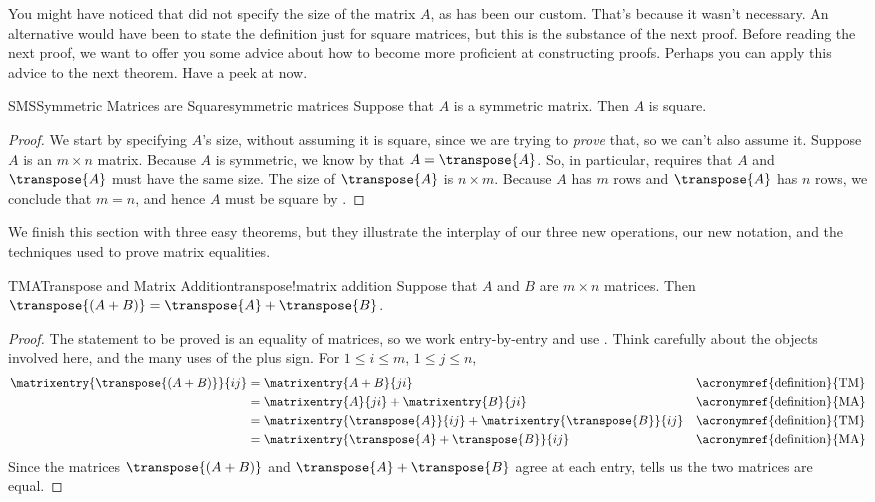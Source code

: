 %
You might have noticed that  did not specify the size of the matrix $A$, as has been our custom.  That's because it wasn't necessary.  An alternative would have been to state the definition just for square matrices, but this is the substance of the next proof.
%
{Before reading the next proof, we want to offer you some advice about how to become more proficient at constructing proofs.  Perhaps you can apply this advice to the next theorem.}
{Have a peek at  now.}
%
\begin{theorem}{SMS}{Symmetric Matrices are Square}{symmetric matrices}
Suppose that $A$ is a symmetric matrix.  Then $A$ is square.
\end{theorem}
%
\begin{proof}
We start by specifying $A$'s size, without assuming it is square, since we are trying to {\em prove} that, so we can't also assume it.  Suppose $A$ is an $m\times n$ matrix.  Because $A$ is symmetric, we know by  that $A=\transpose{A}$.  So, in particular,  requires that $A$ and $\transpose{A}$ must have the same size.  The size of $\transpose{A}$ is $n\times m$.  Because $A$ has $m$ rows and $\transpose{A}$ has $n$ rows, we conclude that $m=n$, and hence $A$ must be square by .
\end{proof}
%
We finish this section with three easy theorems, but they illustrate the interplay of our three new operations, our new notation, and the techniques used to prove matrix equalities.
%
\begin{theorem}{TMA}{Transpose and Matrix Addition}{transpose!matrix addition}
Suppose that $A$ and $B$ are $m\times n$ matrices.  Then  $\transpose{(A+B)}=\transpose{A}+\transpose{B}$.
%
\end{theorem}
%
\begin{proof}
The statement  to be proved is an equality of matrices, so we work entry-by-entry and use .  Think carefully about the objects involved here, and the many uses of the plus sign.  For $1\leq i\leq m$, $1\leq j\leq n$,
%
\begin{align*}
\matrixentry{\transpose{(A+B)}}{ij}
&=\matrixentry{A+B}{ji}&&\text{\acronymref{definition}{TM}}\\
&=\matrixentry{A}{ji}+\matrixentry{B}{ji}&&\text{\acronymref{definition}{MA}}\\
&=\matrixentry{\transpose{A}}{ij}+\matrixentry{\transpose{B}}{ij}&&\text{\acronymref{definition}{TM}}\\
&=\matrixentry{\transpose{A}+\transpose{B}}{ij}&&\text{\acronymref{definition}{MA}}
%
\end{align*}
%
Since the matrices $\transpose{(A+B)}$ and $\transpose{A}+\transpose{B}$ agree at each entry,  tells us the two matrices are equal.
%
\end{proof}
